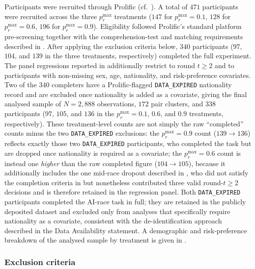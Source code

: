 \documentclass[pdflatex,sn-mathphys-ay]{sn-jnl}
\theoremstyle{thmstyleone}
\theoremstyle{thmstyletwo}
\theoremstyle{thmstylethree}
\begin{document}
Participants were recruited through Prolific (cf.\ ). A total of \(471\) participants were recruited across the three \(p_r^{\max}\) treatments (\(147\) for \(p_r^{\max}=0.1\), \(128\) for \(p_r^{\max}=0.6\), \(196\) for \(p_r^{\max}=0.9\)). Eligibility followed Prolific's standard platform pre-screening together with the comprehension-test and matching requirements described in . After applying the exclusion criteria below, \(340\) participants (\(97\), \(104\), and \(139\) in the three treatments, respectively) completed the full experiment. The panel regressions reported in  additionally restrict to round \(t\geq2\) and to participants with non-missing sex, age, nationality, and risk-preference covariates. Two of the 340 completers have a Prolific-flagged \texttt{DATA\_EXPIRED} nationality record and are excluded once nationality is added as a covariate, giving the final analysed sample of \(N=2{,}888\) observations, \(172\) pair clusters, and \(338\) participants (\(97\), \(105\), and \(136\) in the \(p_r^{\max}=0.1\), \(0.6\), and \(0.9\) treatments, respectively). These treatment-level counts are not simply the raw ``completed'' counts minus the two \texttt{DATA\_EXPIRED} exclusions: the \(p_r^{\max}=0.9\) count (\(139\to136\)) reflects exactly those two \texttt{DATA\_EXPIRED} participants, who completed the task but are dropped once nationality is required as a covariate; the \(p_r^{\max}=0.6\) count is instead one \emph{higher} than the raw completed figure (\(104\to105\)), because it additionally includes the one mid-race dropout described in , who did not satisfy the completion criteria in  but nonetheless contributed three valid round-\(t\geq2\) decisions and is therefore retained in the regression panel. Both \texttt{DATA\_EXPIRED} participants completed the AI-race task in full; they are retained in the publicly deposited dataset and excluded only from analyses that specifically require nationality as a covariate, consistent with the de-identification approach described in the Data Availability statement. A demographic and risk-preference breakdown of the analysed sample by treatment is given in .

\subsubsection{Exclusion criteria}
\label{si:sec:exclusion}
\end{document}
